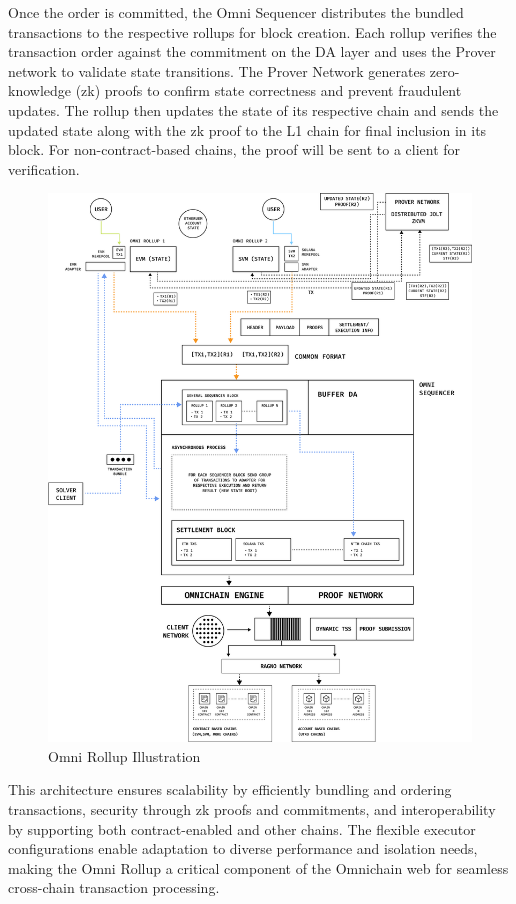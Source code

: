 Once the order is committed, the Omni Sequencer distributes the bundled transactions to the respective rollups for block creation. Each rollup verifies the transaction order against the commitment on the DA layer and uses the Prover network to validate state transitions. The Prover Network generates zero-knowledge (zk) proofs to confirm state correctness and prevent fraudulent updates. The rollup then updates the state of its respective chain and sends the updated state along with the zk proof to the L1 chain for final inclusion in its block. For non-contract-based chains, the proof will be sent to a client for verification. 
\begin{figure}[h!]
    \centering
    \includegraphics[width=0.99\linewidth]{figure/rollup.png}
    \caption{Omni Rollup Illustration}
    \label{fig:rollup}
\end{figure}
This architecture ensures scalability by efficiently bundling and ordering transactions, security through zk proofs and commitments, and interoperability by supporting both contract-enabled and other chains. The flexible executor configurations enable adaptation to diverse performance and isolation needs, making the Omni Rollup a critical component of the Omnichain web for seamless cross-chain transaction processing.



